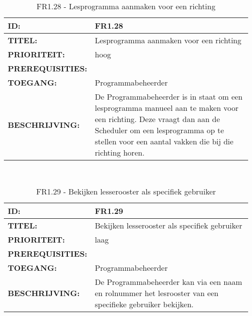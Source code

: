 \noindent\begin{table}[H]
            \begin{tabular}{l | p{10cm}}
                \textbf{ID:} & FR1.28 \\ \hline
                \textbf{TITEL:} & Lesprogramma aanmaken voor een richting\\ \hline
                \textbf{PRIORITEIT:} &  hoog \\ \hline
                \textbf{PREREQUISITIES:} & \\ \hline
                \textbf{TOEGANG:} & Programmabeheerder \\ \hline
                \textbf{BESCHRIJVING:} & De Programmabeheerder is in staat om een lesprogramma manueel aan te maken voor een richting. Deze vraagt dan aan de Scheduler om een lesprogramma op te stellen voor een aantal vakken die bij die richting horen.\\ 
            \end{tabular}\\
            \caption{FR1.28 - Lesprogramma aanmaken voor een richting}
            \label{tab:FR1.28 - Lesprogramma aanmaken voor een richting}
        \end{table}

\noindent\begin{table}[H]
            \begin{tabular}{l | p{10cm}}
                \textbf{ID:} & FR1.29 \\ \hline
                \textbf{TITEL:} & Bekijken lesserooster als specifiek gebruiker\\ \hline
                \textbf{PRIORITEIT:} &  laag \\ \hline
                \textbf{PREREQUISITIES:} & \\ \hline
                \textbf{TOEGANG:} & Programmabeheerder \\ \hline
                \textbf{BESCHRIJVING:} & De Programmabeheerder kan via een naam en rolnummer het lesrooster van een specifieke gebruiker bekijken. \\ 
            \end{tabular}\\
            \caption{FR1.29 - Bekijken lesserooster als specifiek gebruiker}
            \label{tab:FR1.29 - Bekijken lesserooster als specifiek gebruiker}
        \end{table}
        

